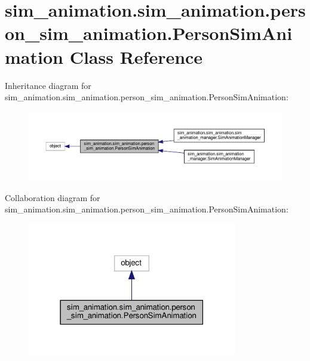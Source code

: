 \hypertarget{classsim__animation_1_1sim__animation_1_1person__sim__animation_1_1PersonSimAnimation}{}\section{sim\+\_\+animation.\+sim\+\_\+animation.\+person\+\_\+sim\+\_\+animation.\+Person\+Sim\+Animation Class Reference}
\label{classsim__animation_1_1sim__animation_1_1person__sim__animation_1_1PersonSimAnimation}


Inheritance diagram for sim\+\_\+animation.\+sim\+\_\+animation.\+person\+\_\+sim\+\_\+animation.\+Person\+Sim\+Animation\+:
\nopagebreak
\begin{figure}[H]
\begin{center}
\leavevmode
\includegraphics[width=350pt]{classsim__animation_1_1sim__animation_1_1person__sim__animation_1_1PersonSimAnimation__inherit__graph}
\end{center}
\end{figure}


Collaboration diagram for sim\+\_\+animation.\+sim\+\_\+animation.\+person\+\_\+sim\+\_\+animation.\+Person\+Sim\+Animation\+:
\nopagebreak
\begin{figure}[H]
\begin{center}
\leavevmode
\includegraphics[width=259pt]{classsim__animation_1_1sim__animation_1_1person__sim__animation_1_1PersonSimAnimation__coll__graph}
\end{center}
\end{figure}
